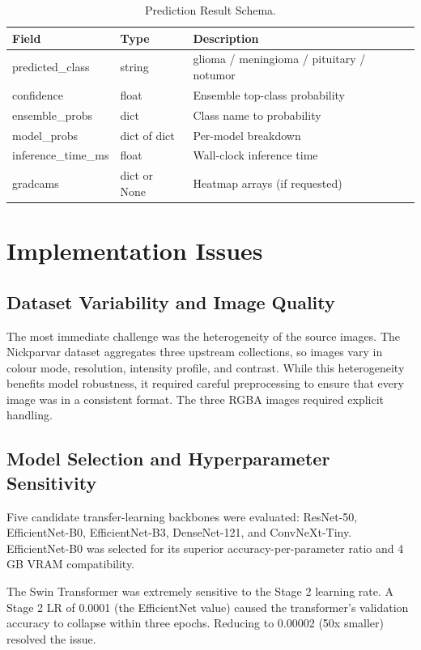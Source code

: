 \documentclass[12pt,a4paper,oneside]{report}
\begin{document}
\begin{table}[H]
  \centering
  \caption{Prediction Result Schema.}
  \label{tab:dd-pred}
  \begin{tabular}{lll}
    \toprule
    \textbf{Field} & \textbf{Type} & \textbf{Description} \\
    \midrule
    predicted\_class & string & glioma / meningioma / pituitary / notumor \\
    confidence & float & Ensemble top-class probability \\
    ensemble\_probs & dict & Class name to probability \\
    model\_probs & dict of dict & Per-model breakdown \\
    inference\_time\_ms & float & Wall-clock inference time \\
    gradcams & dict or None & Heatmap arrays (if requested) \\
    \bottomrule
  \end{tabular}
\end{table}

\chapter{Implementation Issues}

\section{Dataset Variability and Image Quality}

The most immediate challenge was the heterogeneity of the source images. The Nickparvar dataset aggregates three upstream collections, so images vary in colour mode, resolution, intensity profile, and contrast. While this heterogeneity benefits model robustness, it required careful preprocessing to ensure that every image was in a consistent format. The three RGBA images required explicit handling.

\section{Model Selection and Hyperparameter Sensitivity}

Five candidate transfer-learning backbones were evaluated: ResNet-50, EfficientNet-B0, EfficientNet-B3, DenseNet-121, and ConvNeXt-Tiny. EfficientNet-B0 was selected for its superior accuracy-per-parameter ratio and 4 GB VRAM compatibility.

The Swin Transformer was extremely sensitive to the Stage 2 learning rate. A Stage 2 LR of 0.0001 (the EfficientNet value) caused the transformer's validation accuracy to collapse within three epochs. Reducing to 0.00002 (50x smaller) resolved the issue.
\end{document}
